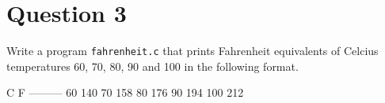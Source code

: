 
\section*{Question 3}

Write a program \texttt{fahrenheit.c} that prints Fahrenheit equivalents of Celcius temperatures 60, 70, 80, 90 and 100 in the following format.

\begin{terminal}
 C    F
---------
 60   140
 70   158
 80   176
 90   194
 100  212
\end{terminal}
